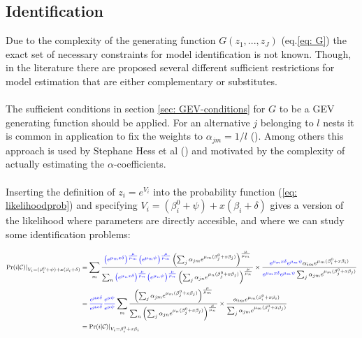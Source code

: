 \subsection{Identification}
Due to the complexity of the generating function $G(z_1,...,z_J)$ (eq.\ref{eq: G}) the exact set of necessary constraints for model identification is not known. Though, in the literature there are proposed several different sufficient restrictions for model estimation that are either complementary or substitutes.
\\ \\
The sufficient conditions in section \ref{sec: GEV-conditions} for $G$ to be a GEV generating function should be applied. For an alternative $j$ belonging to $l$ nests it is common in application to fix the weights to $\alpha_{jm}=1/l$ (\cite{jong_discrete_2014}). Among others this approach is used by Stephane Hess et al (\citeyear{hess_joint_2012}) and motivated by the complexity of actually estimating the $\alpha$-coefficients.
\\ \\
Inserting the definition of $z_i=e^{V_i}$ into the probability function (\ref{eq: likelihoodprob}) and specifying $V_i = (\beta_i^0 + \psi) + x(\beta_i + \delta)$ gives a version of the likelihood where parameters are directly accesible, and where we can study some identification problems:


\begin{equation} \label{eq: psi}
  \footnotesize
  \begin{split}
    \textrm{Pr}(i | \mathcal{C})|_{V_i = (\beta_i^0 + \psi) + x(\beta_i + \delta)}  &=
    \sum_m
    \frac{
    \textcolor{blue}{\left(e^{\mu_m x\delta}\right)^\frac{\mu}{\mu_m}}
    \textcolor{blue}{\left(e^{\mu_m \psi}\right)^\frac{\mu}{\mu_m}}
    \left(\sum_j \alpha_{jm} e^{\mu_m(\beta^0_j+x\beta_j)} \right)^{\frac{\mu}{\mu_m}}}
    {\sum_n
    \textcolor{blue}{\left(e^{\mu_n x\delta}\right)^\frac{\mu}{\mu_n}}
    \textcolor{blue}{\left(e^{\mu_n \psi}\right)^\frac{\mu}{\mu_n}}
    \left(\sum_j \alpha_{jn} e^{\mu_n(\beta^0_j+x\beta_j)} \right)^{\frac{\mu}{\mu_n}}
    } \times
    \frac{
    \textcolor{blue}{e^{\mu_m x\delta}}
    \textcolor{blue}{e^{\mu_m \psi}}
    \alpha_{im}e^{\mu_m(\beta^0_i+x\beta_i)}}
    {\textcolor{blue}{e^{\mu_m x\delta}}
    \textcolor{blue}{e^{\mu_m \psi}}
     \sum_j \alpha_{jm} e^{\mu_m (\beta^0_j+x\beta_j)}}
    \\
    &=
    \textcolor{blue}{\frac{e^{\mu x\delta} }{e^{\mu x\delta}}}
    \textcolor{blue}{\frac{e^{\mu \psi} }{e^{\mu \psi}}}
    \sum_m
    \frac{\left(
     \sum_j \alpha_{jm} e^{\mu_m(\beta^0_j+x\beta_j)} \right)^{\frac{\mu}{\mu_m}}}{\sum_n \left(
      \sum_j \alpha_{jn} e^{\mu_n(\beta^0_j+x\beta_j)} \right)^{\frac{\mu}{\mu_n}}
    } \times
    \frac{\alpha_{im}e^{\mu_m(\beta^0_i+x\beta_i)}}{\sum_j \alpha_{jm} e^{\mu_m (\beta^0_j+x\beta_j)}}
    \\ &=   \textrm{Pr}(i | \mathcal{C})|_{V_i = \beta_i^0 + x\beta_i}
  \end{split}
  \end{equation}

